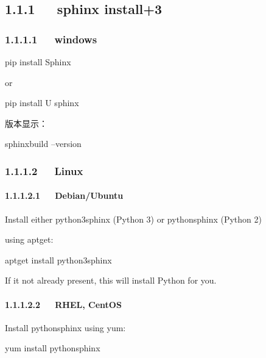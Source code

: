 \documentclass[letterpaper,12pt,english]{sphinxmanual}
\begin{document}
\subsection{1.1.1   sphinx install+3}
\label{\detokenize{001software/001install/sphinx:sphinx-install-3}}


\subsubsection{1.1.1.1   windows}
\label{\detokenize{001software/001install/sphinx:windows}}

pip install Sphinx

or

pip install \sphinxhyphen{}U sphinx

版本显示：

sphinx\sphinxhyphen{}build –version


\subsubsection{1.1.1.2   Linux}
\label{\detokenize{001software/001install/sphinx:linux}}

\paragraph{1.1.1.2.1   Debian/Ubuntu}
\label{\detokenize{001software/001install/sphinx:debian-ubuntu}}
Install either python3\sphinxhyphen{}sphinx (Python 3) or python\sphinxhyphen{}sphinx (Python 2)

using apt\sphinxhyphen{}get:

\begin{sphinxVerbatim}[commandchars=\\\{\}]
\PYGZdl{} apt\PYGZhy{}get install python3\PYGZhy{}sphinx
\end{sphinxVerbatim}

If it not already present, this will install Python for you.


\paragraph{1.1.1.2.2   RHEL, CentOS}
\label{\detokenize{001software/001install/sphinx:rhel-centos}}
Install python\sphinxhyphen{}sphinx using yum:

\begin{sphinxVerbatim}[commandchars=\\\{\}]
\PYGZdl{} yum install python\PYGZhy{}sphinx
\end{sphinxVerbatim}
\end{document}
